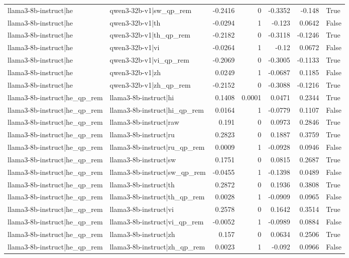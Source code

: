 \begin{table}
\begin{tabular}{l l r r r r l}
llama3-8b-instruct|he & qwen3-32b-v1|sw_qp_rem & -0.2416 & 0 & -0.3352 & -0.148 & True \\
llama3-8b-instruct|he & qwen3-32b-v1|th & -0.0294 & 1 & -0.123 & 0.0642 & False \\
llama3-8b-instruct|he & qwen3-32b-v1|th_qp_rem & -0.2182 & 0 & -0.3118 & -0.1246 & True \\
llama3-8b-instruct|he & qwen3-32b-v1|vi & -0.0264 & 1 & -0.12 & 0.0672 & False \\
llama3-8b-instruct|he & qwen3-32b-v1|vi_qp_rem & -0.2069 & 0 & -0.3005 & -0.1133 & True \\
llama3-8b-instruct|he & qwen3-32b-v1|zh & 0.0249 & 1 & -0.0687 & 0.1185 & False \\
llama3-8b-instruct|he & qwen3-32b-v1|zh_qp_rem & -0.2152 & 0 & -0.3088 & -0.1216 & True \\
llama3-8b-instruct|he_qp_rem & llama3-8b-instruct|hi & 0.1408 & 0.0001 & 0.0471 & 0.2344 & True \\
llama3-8b-instruct|he_qp_rem & llama3-8b-instruct|hi_qp_rem & 0.0164 & 1 & -0.0779 & 0.1107 & False \\
llama3-8b-instruct|he_qp_rem & llama3-8b-instruct|raw & 0.191 & 0 & 0.0973 & 0.2846 & True \\
llama3-8b-instruct|he_qp_rem & llama3-8b-instruct|ru & 0.2823 & 0 & 0.1887 & 0.3759 & True \\
llama3-8b-instruct|he_qp_rem & llama3-8b-instruct|ru_qp_rem & 0.0009 & 1 & -0.0928 & 0.0946 & False \\
llama3-8b-instruct|he_qp_rem & llama3-8b-instruct|sw & 0.1751 & 0 & 0.0815 & 0.2687 & True \\
llama3-8b-instruct|he_qp_rem & llama3-8b-instruct|sw_qp_rem & -0.0455 & 1 & -0.1398 & 0.0489 & False \\
llama3-8b-instruct|he_qp_rem & llama3-8b-instruct|th & 0.2872 & 0 & 0.1936 & 0.3808 & True \\
llama3-8b-instruct|he_qp_rem & llama3-8b-instruct|th_qp_rem & 0.0028 & 1 & -0.0909 & 0.0965 & False \\
llama3-8b-instruct|he_qp_rem & llama3-8b-instruct|vi & 0.2578 & 0 & 0.1642 & 0.3514 & True \\
llama3-8b-instruct|he_qp_rem & llama3-8b-instruct|vi_qp_rem & -0.0052 & 1 & -0.0989 & 0.0884 & False \\
llama3-8b-instruct|he_qp_rem & llama3-8b-instruct|zh & 0.157 & 0 & 0.0634 & 0.2506 & True \\
llama3-8b-instruct|he_qp_rem & llama3-8b-instruct|zh_qp_rem & 0.0023 & 1 & -0.092 & 0.0966 & False \\

\end{tabular}
\end{table}
